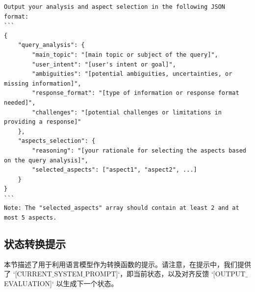 \begin{lstlisting}[breaklines=true,breakatwhitespace=true]
Output your analysis and aspect selection in the following JSON format:
```
{
    "query_analysis": {
        "main_topic": "[main topic or subject of the query]",
        "user_intent": "[user's intent or goal]",
        "ambiguities": "[potential ambiguities, uncertainties, or missing information]",
        "response_format": "[type of information or response format needed]",
        "challenges": "[potential challenges or limitations in providing a response]"
    },
    "aspects_selection": {
        "reasoning": "[your rationale for selecting the aspects based on the query analysis]",
        "selected_aspects": ["aspect1", "aspect2", ...]
    }
}
```
Note: The "selected_aspects" array should contain at least 2 and at most 5 aspects.
\end{lstlisting}
\subsection{状态转换提示}

本节描述了用于利用语言模型作为转换函数的提示。请注意，在提示中，我们提供了 `[CURRENT$\_$SYSTEM$\_$PROMPT]`，即当前状态，以及对齐反馈 `[OUTPUT$\_$EVALUATION]` 以生成下一个状态。

